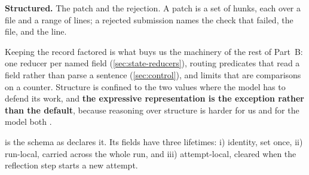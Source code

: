 \item \textbf{Structured.} The patch and the rejection. A patch is a set of hunks, each over a file
and a range of lines; a rejected submission names the check that failed, the file, and the line.

\ei

Keeping the record factored is what buys us the machinery of the rest of Part~B: one reducer per
named field (\cref{sec:state-reducers}), routing predicates that read a field rather than parse a
sentence (\cref{sec:control}), and limits that are comparisons on a counter. Structure is confined
to the two values where the model has to defend its work, and \textbf{the expressive representation is
the exception rather than the default}, because reasoning over structure is harder for us and for
the model both \citep[\S2.4.7]{russell2020aima}.

 is the schema as  declares it. Its fields have three lifetimes: i) identity, set once, ii)
run-local, carried across the whole run, and iii) attempt-local, cleared when the reflection step
starts a new attempt.

